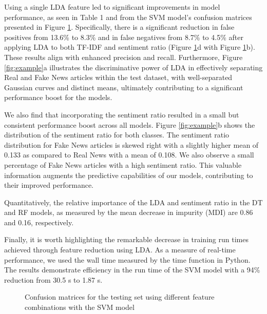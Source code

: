 \documentclass[10pt,a4paper,twoside]{article}
\begin{document}
\vspace{-0.5em}

Using a single LDA feature led to significant improvements in model performance, as seen in Table 1 and from the SVM model's confusion matrices presented in Figure \ref{fig:conf}.  Specifically, there is a significant reduction in false positives from 13.6\% to 8.3\% and in false negatives from  8.7\% to 4.5\%  after applying LDA to both TF-IDF and sentiment ratio (Figure \ref{fig:conf}d with Figure \ref{fig:conf}b). These results align with enhanced precision and recall. Furthermore, Figure \ref{fig:example}a illustrates the discriminative power of LDA in effectively separating Real and Fake News articles within the test dataset, with well-separated Gaussian curves and distinct means, ultimately contributing to a significant performance boost for the models. 

We also find that incorporating the sentiment ratio resulted in a small but consistent performance boost across all models. Figure \ref{fig:example}b shows the distribution of the sentiment ratio for both classes. The sentiment ratio distribution for Fake News articles is skewed right with a slightly higher mean of 0.133 as compared to Real News with a mean of 0.108. We also observe a small percentage of Fake News articles with a high sentiment ratio. This valuable information augments the predictive capabilities of our models, contributing to their improved performance.

Quantitatively, the relative importance of the LDA and sentiment ratio in the DT and RF models, as measured by the mean decrease in impurity (MDI) are 0.86 and 0.16, respectively.

Finally, it is worth highlighting the remarkable decrease in training run times achieved through feature reduction using LDA. As a measure of real-time performance, we used the wall time measured by the time function in Python. The results demonstrate efficiency in the run time of the SVM model with a 94\% reduction from 30.5 s to 1.87 s.

\vspace{-1em}
\begin{figure}[h!]
    \centering
    \caption{Confusion matrices for the testing set using different feature combinations with the SVM model}%
    \label{fig:conf}%
\end{figure}
\end{document}
